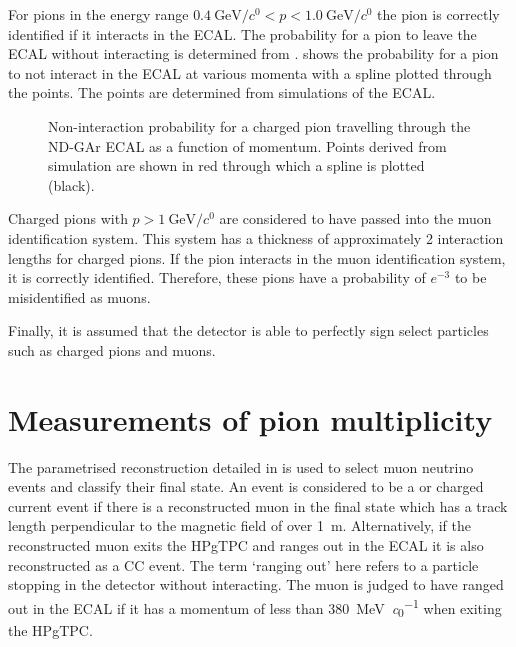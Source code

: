 For pions in the energy range $\SI{0.4}{\GeV\per\clight} < p < \SI{1.0}{\GeV\per\clight}$ the pion is correctly identified if it interacts in the ECAL.
The probability for a pion to leave the ECAL without interacting is determined from .
 shows the probability for a pion to not interact in the ECAL at various momenta with a spline plotted through the points.
The points are determined from simulations of the ECAL.

\begin{figure}[h]
	\centering
	\begin{adjustbox}{max totalsize=.6\linewidth, center}
		
	\end{adjustbox}
	\caption[Non-interaction probability for a charged pion travelling through the ND-GAr ECAL as a function of momentum]{Non-interaction probability for a charged pion travelling through the ND-GAr ECAL as a function of momentum. Points derived from simulation are shown in red through which a spline is plotted (black).}
	\label{fig:interactionSpline}
\end{figure}

Charged pions with $p>\SI{1}{\GeV\per\clight}$ are considered to have passed into the muon identification system. 
This system has a thickness of approximately 2 interaction lengths for charged pions.
If the pion interacts in the muon identification system, it is correctly identified.
Therefore, these pions have a probability of $e^{-3}$ to be misidentified as muons.

Finally, it is assumed that the detector is able to perfectly sign select particles such as charged pions and muons.

\section{Measurements of pion multiplicity}
\label{sec:dune_ndrwt:pionMulti}

The parametrised reconstruction detailed in  is used to select muon neutrino events and classify their final state.
An event is considered to be a \numu or \anumu charged current event if there is a reconstructed muon in the final state which has a track length perpendicular to the magnetic field of over \SI{1}{\metre}.
Alternatively, if the reconstructed muon exits the HPgTPC and ranges out in the ECAL it is also reconstructed as a \numu CC event.
The term `ranging out' here refers to a particle stopping in the detector without interacting.
The muon is judged to have ranged out in the ECAL if it has a momentum of less than \SI{380}{\MeV\per\clight} when exiting the HPgTPC. 

